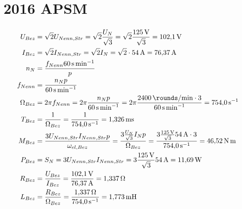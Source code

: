 \documentclass[11pt,a4paper]{scrartcl}
\newcommand{\0}{_{\mybr{0}}}
\newcommand{\1}{_{\mybr{1}}}
\newcommand{\2}{_{\mybr{2}}}
\begin{document}
\part{2016 APSM}
\section{}
\begin{align}
	U_{Bez}&=\sqrt{2}U_{Nenn,Str}=\sqrt{2}\frac{U_N}{\sqrt{3}}=\sqrt{2}\frac{\SI{125}{\volt}}{\sqrt{3}}=\SI{102.1}{\volt}\\
	I_{Bez}&=\sqrt{2}I_{Nenn,Str}=\sqrt{2}I_N=\sqrt{2}\cdot\SI{54}{\ampere}=\SI{76.37}{\ampere}\\
	n_N&=\frac{f_{Nenn}\SI{60}{\second\per\minute}}{p}\\
	f_{Nenn}&=\frac{n_N p}{\SI{60}{\second\per\minute}}\\
	\Omega_{Bez}&=2\pi f_{Nenn}=2\pi\frac{n_N p}{\SI{60}{\second\per\minute}}=2\pi\frac{\SI{2400}{\rounds\per\minute}\cdot 3}{\SI{60}{\second\per\minute}}=\SI{754.0}{\per\second}\\
	T_{Bez}&=\frac{1}{\Omega_{Bez}}=\frac{1}{\SI{754.0}{\per\second}}=\SI{1.326}{\milli\second}\\
	M_{Bez}&=\frac{3 U_{Nenn,Str}I_{Nenn,Str}p}{\omega_{el,Bez}}=\frac{3 \frac{U_N}{\sqrt{3}}I_{N}p}{\Omega_{Bez}}=\frac{3\frac{\SI{125}{\volt}}{\sqrt{3}}\SI{54}{\ampere}\cdot 3}{\SI{754.0}{\per\second}}=\SI{46.52}{\newton\metre}\\
	P_{Bez}&=S_N=3 U_{Nenn,Str} I_{Nenn,Str}=3\frac{\SI{125}{\volt}}{\sqrt{3}}\SI{54}{\ampere}=\SI{11.69}{\watt}\\
	R_{Bez}&=\frac{U_{Bez}}{I_{Bez}}=\frac{\SI{102.1}{\volt}}{\SI{76.37}{\ampere}}=\SI{1.337}{\ohm}\\
	L_{Bez}&=\frac{R_{Bez}}{\Omega_{Bez}}=\frac{\SI{1.337}{\ohm}}{\SI{754.0}{\per\second}}=\SI{1.773}{\milli\henry}
\end{align}
\end{document}
